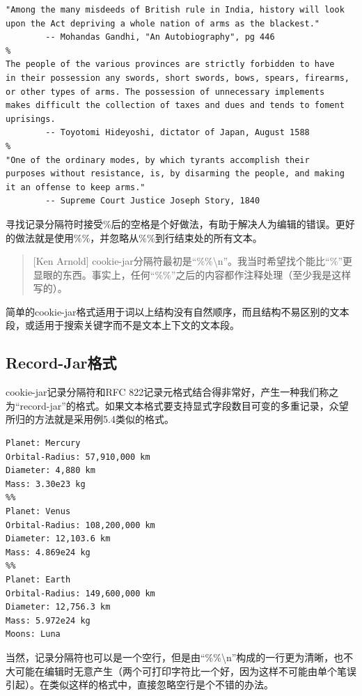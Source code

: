 \documentclass[12pt,oneside]{book}
\begin{document}
\begin{Verbatim}[label=例5.3 fortune文件实例]
"Among the many misdeeds of British rule in India, history will look
upon the Act depriving a whole nation of arms as the blackest."
        -- Mohandas Gandhi, "An Autobiography", pg 446
%
The people of the various provinces are strictly forbidden to have 
in their possession any swords, short swords, bows, spears, firearms,
or other types of arms. The possession of unnecessary implements 
makes difficult the collection of taxes and dues and tends to foment 
uprisings.
        -- Toyotomi Hideyoshi, dictator of Japan, August 1588
%
"One of the ordinary modes, by which tyrants accomplish their 
purposes without resistance, is, by disarming the people, and making 
it an offense to keep arms."
        -- Supreme Court Justice Joseph Story, 1840
\end{Verbatim}

寻找记录分隔符时接受\%{}后的空格是个好做法，有助于解决人为编辑的错误。更好的做法就是使用\%{}\%{}，并忽略从\%{}\%{}到行结束处的所有文本。
\begin{quote}[Ken Arnold]
cookie-jar分隔符最初是“\%{}\%{}\textbackslash n”。我当时希望找个能比“\%{}”更显眼的东西。事实上，任何“\%{}\%{}”之后的内容都作注释处理（至少我是这样写的）。
\end{quote}

简单的cookie-jar格式适用于词以上结构没有自然顺序，而且结构不易区别的文本段，或适用于搜索关键字而不是文本上下文的文本段。


\subsection{Record-Jar格式}
cookie-jar记录分隔符和RFC 822记录元格式结合得非常好，产生一种我们称之为“record-jar”的格式。如果文本格式要支持显式字段数目可变的多重记录，众望所归的方法就是采用例5.4类似的格式。

\begin{Verbatim}[label=例5.4以record-jar格式表达的三颗行星基本数据]
Planet: Mercury
Orbital-Radius: 57,910,000 km
Diameter: 4,880 km
Mass: 3.30e23 kg
%%
Planet: Venus
Orbital-Radius: 108,200,000 km
Diameter: 12,103.6 km
Mass: 4.869e24 kg
%%
Planet: Earth
Orbital-Radius: 149,600,000 km
Diameter: 12,756.3 km
Mass: 5.972e24 kg
Moons: Luna
\end{Verbatim}

当然，记录分隔符也可以是一个空行，但是由“\%{}\%\textbackslash n”构成的一行更为清晰，也不大可能在编辑时无意产生（两个可打印字符比一个好，因为这样不可能由单个笔误引起）。在类似这样的格式中，直接忽略空行是个不错的办法。
\end{document}
